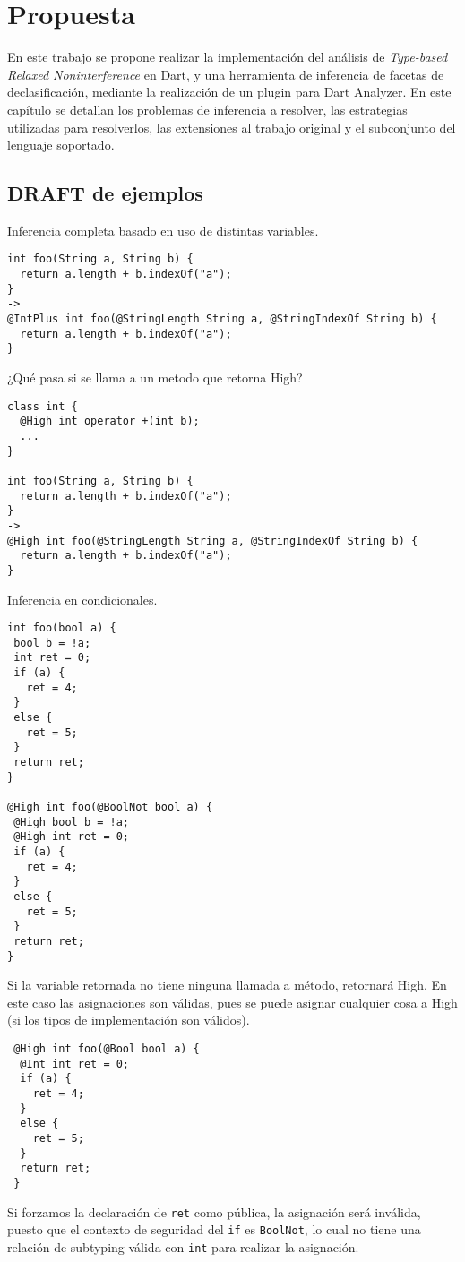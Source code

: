 \chapter{Propuesta}

En este trabajo se propone realizar la implementación del análisis de \textit{Type-based Relaxed Noninterference} en Dart, y una herramienta de inferencia de facetas de declasificación, mediante la realización de un plugin para Dart Analyzer. En este capítulo se detallan los problemas de inferencia a resolver, las estrategias utilizadas para resolverlos, las extensiones al trabajo original y el subconjunto del lenguaje soportado.

\section{DRAFT de ejemplos}

Inferencia completa basado en uso de distintas variables.
 \begin{lstlisting}
int foo(String a, String b) {
  return a.length + b.indexOf("a");
}
->
@IntPlus int foo(@StringLength String a, @StringIndexOf String b) {
  return a.length + b.indexOf("a");
}
 \end{lstlisting}

¿Qué pasa si se llama a un metodo que retorna High?

 \begin{lstlisting}
class int {
  @High int operator +(int b);
  ...
}

int foo(String a, String b) {
  return a.length + b.indexOf("a");
}
->
@High int foo(@StringLength String a, @StringIndexOf String b) {
  return a.length + b.indexOf("a");
}
 \end{lstlisting}

 Inferencia en condicionales.

 \begin{lstlisting}
int foo(bool a) {
 bool b = !a;
 int ret = 0;
 if (a) {
   ret = 4;
 }
 else {
   ret = 5;
 }
 return ret;
}

@High int foo(@BoolNot bool a) {
 @High bool b = !a;
 @High int ret = 0;
 if (a) {
   ret = 4;
 }
 else {
   ret = 5;
 }
 return ret;
}
 \end{lstlisting}

  Si la variable retornada no tiene ninguna llamada a método, retornará High. En este caso las asignaciones son válidas, pues se puede asignar cualquier cosa a High (si los tipos de implementación son válidos).

  \begin{lstlisting}
 @High int foo(@Bool bool a) {
  @Int int ret = 0;
  if (a) {
    ret = 4;
  }
  else {
    ret = 5;
  }
  return ret;
 }
  \end{lstlisting}

  Si forzamos la declaración de \texttt{ret} como pública, la asignación será inválida, puesto que el contexto de seguridad del \texttt{if} es \texttt{BoolNot}, lo cual no tiene una relación de subtyping válida con \texttt{int} para realizar la asignación.
